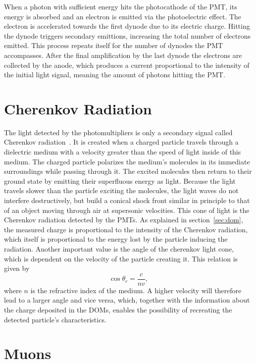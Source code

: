 When a photon with sufficient energy hits the photocathode of the PMT, its energy is absorbed and an electron is emitted via the photoelectric effect.
The electron is accelerated towards the first dynode due to its electric charge. Hitting the dynode triggers secondary emittions, increasing the total 
number of electrons emitted. This process repeats itself for the number of dynodes the PMT accompasses. After the final amplification by the last 
dynode the electrons are collected by the anode, which produces a current proportional to the intensity of the initial light signal, meaning the amount of
photons hitting the PMT\@. 

\section{Cherenkov Radiation}

The light detected by the photomultipliers is only a secondary signal called Cherenkov radiation~\cite{einstein}. It is created when a charged particle travels through a 
dielectric medium with a velocity greater than the speed of light inside of this medium. The charged particle polarizes the medium's molecules in its
immediate surroundings while passing through it. The excited molecules then return to their ground state by emitting their superfluous energy as light.
Because the light travels slower than the particle exciting the molecules, the light waves do not interfere destructively, but build a conical shock front 
similar in principle to that of an object moving through air at supersonic velocities. This cone of light is the Cherenkov radiation detected by the PMTs.
As explained in section~\ref{sec:dom}, the measured charge is proportional to the intensity of the Cherenkov radiation, which itself is proportional to the 
energy lost by the particle inducing the radiation. Another important value is the angle of the cherenkov light cone, which is dependent on the velocity of the 
particle creating it. This relation is given by 
\begin{equation}
    \cos{\theta_c} = \frac{c}{nv},
\end{equation}
where $n$ is the refractive index of the medium. A higher velocity will therefore lead to a larger angle and vice versa, which, together with the information about 
the charge deposited in the DOMs, enables the possibility of recreating the detected particle's characteristics.

\section{Muons}\label{sec:muons}

